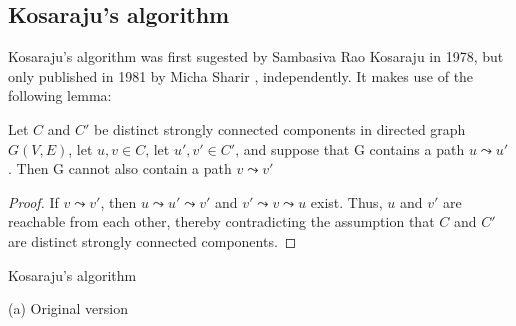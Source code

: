 \subsection{Kosaraju's algorithm} \label{algorithm-scc-kosaraju}
Kosaraju's algorithm was first sugested by Sambasiva Rao Kosaraju in 1978, but only published in 1981 by Micha Sharir \cite{sharir81}, independently. It makes use of the following lemma:
\begin{lemma} \label{lem:kosaraju1}
    Let $C$ and $C'$ be distinct strongly connected components in directed graph $G(V,E)$, let $u,v \in C$, let $u',v' \in C'$, and suppose that G contains a path $u \leadsto u'$. Then G cannot also contain a path $v \leadsto v'$
\end{lemma}
\begin{proof}
    If $v \leadsto v'$, then $u \leadsto u' \leadsto v'$ and $v' \leadsto v \leadsto u$ exist. Thus, $u$ and $v'$ are reachable from each other, thereby contradicting the assumption that $C$ and $C'$ are distinct strongly connected components.
\end{proof}
\begin{center}
    \begin{algorithm}
        \caption{Kosaraju's algorithm}
        \label{alg-kosaraju}
        \begin{minipage}[t]{0.49\linewidth}
            (a) Original version
            \begin{algorithmic}[1]
                \EndFunction
            \end{algorithmic}
        \end{minipage}
    \end{algorithm}
\end{center}
